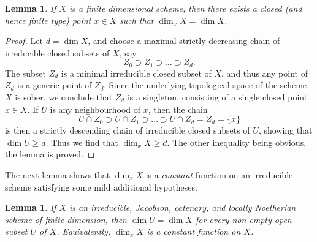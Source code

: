 \documentclass{stacks-project}
\theoremstyle{plain}
\newtheorem{lemma}[subsection]{Lemma}
\theoremstyle{definition}
\theoremstyle{remark}
\numberwithin{equation}{subsection}
\begin{document}
\begin{lemma}
\label{lemma-dimension-achieved-by-finite-type-point}
If $X$ is a finite dimensional scheme,
then there exists a closed (and hence finite type) point $x \in X$
such that $\dim_x X = \dim X$.
\end{lemma}

\begin{proof}
Let $d = \dim X$,
and choose a maximal strictly decreasing
chain of irreducible closed subsets of $X$,
say
\begin{equation}
\label{equation-maximal-chain}
Z_0 \supset Z_1 \supset \ldots \supset Z_d.
\end{equation}
The subset $Z_d$ is a minimal irreducible closed subset of $X$,
and thus any point of $Z_d$ is a generic point of $Z_d$.
Since the underlying topological space of the scheme $X$ is sober,
we conclude that $Z_d$ is a singleton, consisting of a single
closed point $x \in X$.
If $U$ is
any neighbourhood of $x$, then
the chain
$$
U\cap Z_0 \supset U\cap Z_1 \supset \ldots \supset U\cap Z_d = Z_d =
\{x\}
$$
is then a strictly descending chain of irreducible
closed subsets of $U$, showing that $\dim U \geq d$.
Thus we find that $\dim_x X \geq d$.  The other inequality
being obvious, the lemma is proved.
\end{proof}

\noindent
The next lemma shows that $\dim_x X$ is a {\it constant} function
on an irreducible scheme satisfying some mild additional hypotheses.

\begin{lemma}
\label{lemma-constancy-of-dimension}
If $X$ is an irreducible, Jacobson, catenary, and locally Noetherian
scheme of finite dimension,
then $\dim U = \dim X$ for every
non-empty open subset $U$ of $X$.
Equivalently, $\dim_x X$ is a constant function on $X$.
\end{lemma}
\end{document}
